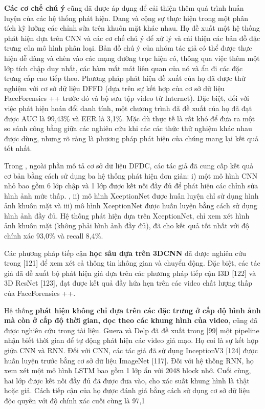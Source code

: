 \documentclass{article}
\begin{document}
\textbf{Các cơ chế chú ý} cũng đã được áp dụng để cải thiện thêm quá trình huấn luyện của các hệ thống phát hiện. Dang và cộng sự thực hiện trong  một phân tích kỹ lưỡng các chỉnh sửa trên khuôn mặt khác nhau. Họ đề xuất một hệ thống phát hiện dựa trên CNN và các cơ chế chú ý để xử lý và cải thiện các bản đồ đặc trưng của mô hình phân loại. Bản đồ chú ý của nhóm tác giả có thể được thực hiện dễ dàng và chèn vào các mạng đường trục hiện có, thông qua việc thêm một lớp tích chập duy nhất, các hàm mất mát liên quan của nó và ẩn đi các đặc trưng cấp cao tiếp theo. Phương pháp phát hiện đề xuất của họ đã được thử nghiệm với cơ sở dữ liệu DFFD (dựa trên sự kết hợp của cơ sở dữ liệu FaceForensics ++ trước đó và bộ sưu tập video từ Internet). Đặc biệt, đối với việc phát hiện hoán đổi danh tính, một chương trình đã đề xuất của họ đã đạt được AUC là 99,43\% và EER là 3,1\%. Mặc dù thực tế là rất khó để đưa ra một so sánh công bằng giữa các nghiên cứu khi các các thức thử nghiệm khác nhau được dùng, nhưng rõ ràng là phương pháp phát hiện của chúng mang lại kết quả tốt nhất.

Trong , ngoài phần mô tả cơ sở dữ liệu DFDC, các tác giả đã cung cấp kết quả cơ bản bằng cách sử dụng ba hệ thống phát hiện đơn giản: i) một mô hình CNN nhỏ bao gồm 6 lớp chập và 1 lớp được kết nối đầy đủ để phát hiện các chỉnh sửa hình ảnh mức thấp. , ii) mô hình XceptionNet được huấn luyện chỉ sử dụng hình ảnh khuôn mặt và iii) mô hình XceptionNet được huấn luyện bằng cách sử dụng hình ảnh đầy đủ. Hệ thống phát hiện dựa trên XceptionNet, chỉ xem xét hình ảnh khuôn mặt (không phải hình ảnh đầy đủ), đã cho kết quả tốt nhất với độ chính xác 93,0\% và recall 8,4\%.

Các phương pháp tiếp cận \textbf{học sâu dựa trên 3DCNN} đã được nghiên cứu trong [121] để xem xét cả thông tin không gian và chuyển động. Đặc biệt, các tác giả đã đề xuất bộ phát hiện giả dựa trên các phương pháp tiếp cận I3D [122] và 3D ResNet [123], đạt được kết quả đầy hứa hẹn trên các video chất lượng thấp của FaceForensics ++.

Hệ thống \textbf{phát hiện không chỉ dựa trên các đặc trưng ở cấp độ hình ảnh mà còn ở cấp độ thời gian, dọc theo các khung hình của video}, cũng đã được nghiên cứu trong tài liệu. Guera và Delp đã đề xuất trong [99] một pipeline nhận biết thời gian để tự động phát hiện các video giả mạo. Họ coi là sự kết hợp giữa CNN và RNN. Đối với CNN, các tác giả đã sử dụng InceptionV3 [124] được huấn luyện trước bằng cơ sở dữ liệu ImageNet [117]. Đối với hệ thống RNN, họ xem xét một mô hình LSTM bao gồm 1 lớp ẩn với 2048 block nhớ. Cuối cùng, hai lớp được kết nối đầy đủ đã được đưa vào, cho xác suất khung hình là thật hoặc giả. Cách tiếp cận của họ được đánh giá bằng cách sử dụng cơ sở dữ liệu độc quyền với độ chính xác cuối cùng là 97,1%
\end{document}

